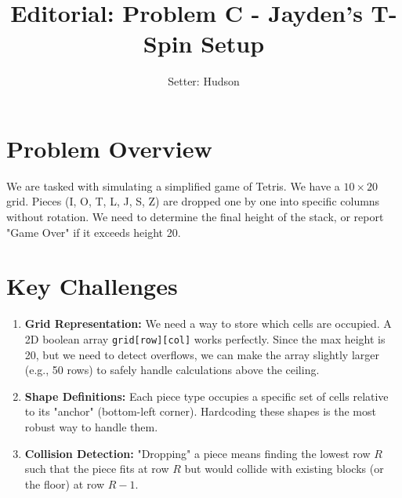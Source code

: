 \documentclass[11pt]{article}
\title{\textbf{Editorial: Problem C - Jayden's T-Spin Setup}}
\author{Setter: Hudson}
\date{}
\begin{document}
\maketitle

\section*{Problem Overview}
We are tasked with simulating a simplified game of Tetris. We have a $10 \times 20$ grid. Pieces (I, O, T, L, J, S, Z) are dropped one by one into specific columns without rotation. We need to determine the final height of the stack, or report "Game Over" if it exceeds height 20.

\section*{Key Challenges}
\begin{enumerate}
    \item \textbf{Grid Representation:} We need a way to store which cells are occupied. A 2D boolean array \texttt{grid[row][col]} works perfectly. Since the max height is 20, but we need to detect overflows, we can make the array slightly larger (e.g., 50 rows) to safely handle calculations above the ceiling.
    \item \textbf{Shape Definitions:} Each piece type occupies a specific set of cells relative to its "anchor" (bottom-left corner). Hardcoding these shapes is the most robust way to handle them.
    \item \textbf{Collision Detection:} "Dropping" a piece means finding the lowest row $R$ such that the piece fits at row $R$ but would collide with existing blocks (or the floor) at row $R-1$.
\end{enumerate}
\end{document}
